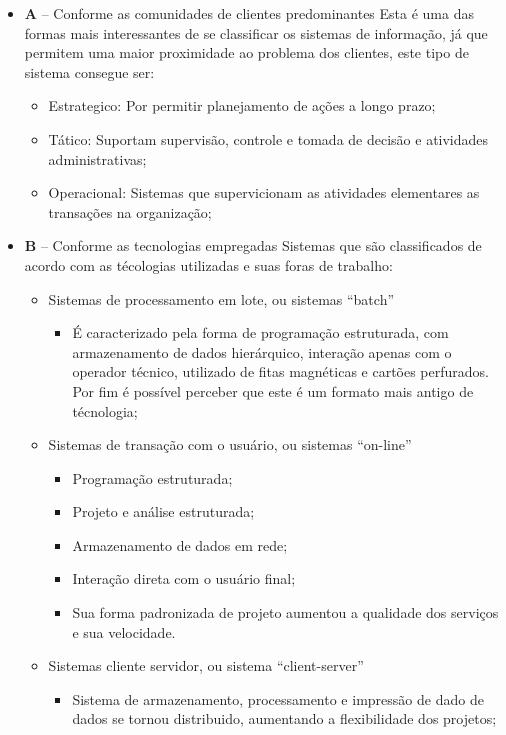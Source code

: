 \documentclass[
	12pt,				%
	openany,			%
	a4paper,			%
	chapter=TITLE,		%
	section=TITLE,		%
	english,
	brazil				%
]{abntex2}
\begin{document}
\begin{itemize}
\begin{itemize}
	\begin{itemize}
	\item[] \textbf{A} – Conforme as comunidades de clientes predominantes
	Esta é uma das formas mais interessantes de se classificar os sistemas de informação, já que permitem uma maior proximidade ao problema dos clientes, este tipo de sistema consegue ser:
		\begin{itemize}
			\item Estrategico: Por permitir planejamento de ações a longo prazo;
			\item Tático: Suportam supervisão, controle e tomada de decisão e atividades administrativas;
			\item Operacional: Sistemas que supervicionam as atividades elementares as transações na organização;
		\end{itemize}
	\item[] \textbf{B} – Conforme as tecnologias empregadas
	Sistemas que são classificados de acordo com as técologias utilizadas e suas foras de trabalho:
		\begin{itemize}
			\item Sistemas de processamento em lote, ou sistemas “batch”
				\begin{itemize}
					\item É caracterizado pela forma de programação estruturada, com armazenamento de dados hierárquico, interação apenas com o operador técnico, utilizado de fitas magnéticas e cartões perfurados. Por fim é possível perceber que este é um formato mais antigo de técnologia;
				\end{itemize}
			\item Sistemas de transação com o usuário, ou sistemas “on-line”
				\begin{itemize}
					\item Programação estruturada;
					\item Projeto e análise estruturada;
					\item Armazenamento de dados em rede;
					\item Interação direta com o usuário final;
					\item Sua forma padronizada de projeto aumentou a qualidade dos serviços e sua velocidade.
				\end{itemize}
			\item Sistemas cliente servidor, ou sistema “client-server”
				\begin{itemize}
					\item Sistema de armazenamento, processamento e impressão de dado de dados se tornou distribuido, aumentando a flexibilidade dos projetos;

\end{itemize}
\end{itemize}
\end{itemize}
\end{itemize}
\end{itemize}
\end{document}
